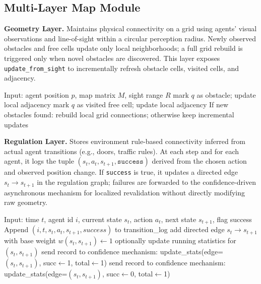 \subsection{Multi-Layer Map Module}
\textbf{Geometry Layer.} Maintains physical connectivity on a grid using agents' visual observations and line-of-sight within a circular perception radius. Newly observed obstacles and free cells update only local neighborhoods; a full grid rebuild is triggered only when novel obstacles are discovered. This layer exposes \texttt{update\_from\_sight} to incrementally refresh obstacle cells, visited cells, and adjacency.

\begin{algorithm}[H]
\caption{Geometry layer: LOS-based incremental update}
\begin{algorithmic}[1]
\STATE Input: agent position $p$, map matrix $M$, sight range $R$
    \STATE mark $q$ as obstacle; update local adjacency
  \ELSE
    \STATE mark $q$ as visited free cell; update local adjacency
  \ENDIF
\ENDFOR
\STATE If new obstacles found: rebuild local grid connections; otherwise keep incremental updates
\end{algorithmic}
\end{algorithm}

\textbf{Regulation Layer.} Stores environment rule-based connectivity inferred from actual agent transitions (e.g., doors, traffic rules). At each step and for each agent, it logs the tuple $(s_t, a_t, s_{t+1}, \texttt{success})$ derived from the chosen action and observed position change. If \texttt{success} is true, it updates a directed edge $s_t\!\to\!s_{t+1}$ in the regulation graph; failures are forwarded to the confidence-driven asynchronous mechanism for localized revalidation without directly modifying raw geometry.

\begin{algorithm}[H]
\caption{Regulation layer: transition logging with success/failure}
\begin{algorithmic}[1]
\STATE Input: time $t$, agent id $i$, current state $s_t$, action $a_t$, next state $s_{t+1}$, flag success
\STATE Append $(i, t, s_t, a_t, s_{t+1}, success)$ to transition\_log
    \STATE add directed edge $s_t\!\to\!s_{t+1}$ with base weight $w(s_t,s_{t+1}) \leftarrow 1$
  \ELSE
    \STATE optionally update running statistics for $(s_t,s_{t+1})$
  \ENDIF
\STATE send record to confidence mechanism: update\_stats(edge=$(s_t,s_{t+1})$, succ$\leftarrow$1, total$\leftarrow$1)
\ELSE
\STATE send record to confidence mechanism: update\_stats(edge=$(s_t,s_{t+1})$, succ$\leftarrow$0, total$\leftarrow$1)
\ENDIF
\end{algorithmic}
\end{algorithm}

